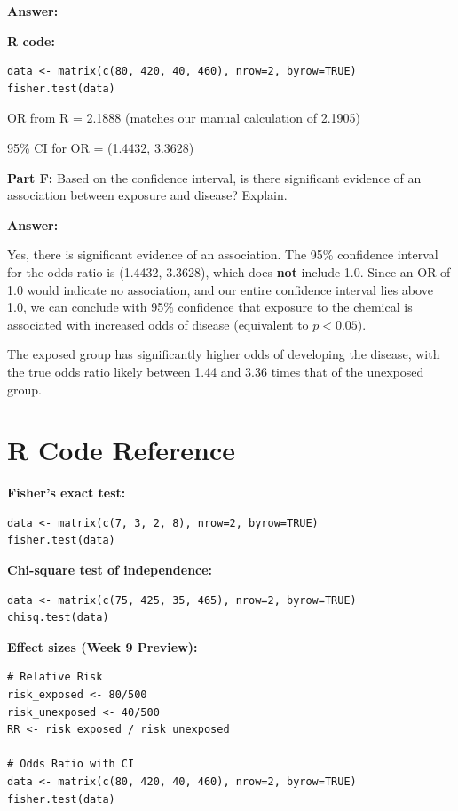 \documentclass[11pt]{article}
\begin{document}
\vspace{0.3cm}

\textbf{Answer:}

\textbf{R code:}
\begin{verbatim}
data <- matrix(c(80, 420, 40, 460), nrow=2, byrow=TRUE)
fisher.test(data)
\end{verbatim}

\vspace{0.3cm}

OR from R = 2.1888 (matches our manual calculation of 2.1905)

\vspace{0.3cm}

95\% CI for OR = (1.4432, 3.3628)

\vspace{0.5cm}

\textbf{Part F:} Based on the confidence interval, is there significant evidence of an association between exposure and disease? Explain.

\vspace{0.3cm}

\textbf{Answer:}

Yes, there is significant evidence of an association. The 95\% confidence interval for the odds ratio is (1.4432, 3.3628), which does \textbf{not} include 1.0. Since an OR of 1.0 would indicate no association, and our entire confidence interval lies above 1.0, we can conclude with 95\% confidence that exposure to the chemical is associated with increased odds of disease (equivalent to $p < 0.05$).

\vspace{0.3cm}

The exposed group has significantly higher odds of developing the disease, with the true odds ratio likely between 1.44 and 3.36 times that of the unexposed group.

\newpage

\section*{R Code Reference}

\textbf{Fisher's exact test:}
\begin{verbatim}
data <- matrix(c(7, 3, 2, 8), nrow=2, byrow=TRUE)
fisher.test(data)
\end{verbatim}

\textbf{Chi-square test of independence:}
\begin{verbatim}
data <- matrix(c(75, 425, 35, 465), nrow=2, byrow=TRUE)
chisq.test(data)
\end{verbatim}

\textbf{Effect sizes (Week 9 Preview):}
\begin{verbatim}
# Relative Risk
risk_exposed <- 80/500
risk_unexposed <- 40/500
RR <- risk_exposed / risk_unexposed

# Odds Ratio with CI
data <- matrix(c(80, 420, 40, 460), nrow=2, byrow=TRUE)
fisher.test(data)
\end{verbatim}
\end{document}
